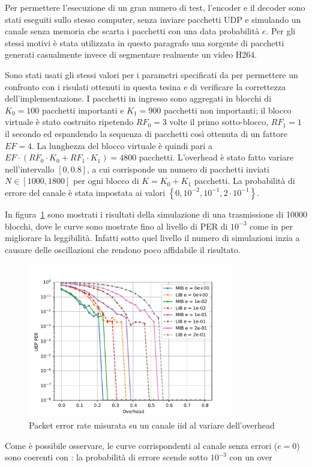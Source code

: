 \documentclass[italian, a4paper, 12pt]{article}
\begin{document}
Per permettere l'esecuzione di un gran numero di test, l'encoder e il
decoder sono stati eseguiti sullo stesso computer, senza inviare
pacchetti UDP e simulando un canale senza memoria che scarta i
pacchetti con una data probabilità $e$.
%
Per gli stessi motivi è stata utilizzata in questo paragrafo una
sorgente di pacchetti generati casualmente invece di segmentare
realmente un video H264.

Sono stati usati gli stessi valori per i parametri specificati da
\cite{uep} per permettere un confronto con i risulati ottenuti in
questa tesina e di verificare la correttezza dell'implementazione.
%
I pacchetti in ingresso sono aggregati in blocchi di $K_0 = 100$
pacchetti importanti e $K_1 = 900$ pacchetti non importanti; il blocco
virtuale è stato costruito ripetendo $RF_0 = 3$ volte il primo
sotto-blocco, $RF_1 = 1$ il secondo ed espandendo la sequenza di
pacchetti così ottenuta di un fattore $EF = 4$. La lunghezza del
blocco virtuale è quindi pari a $EF \cdot \left( RF_0 \cdot K_0 + RF_1
\cdot K_1 \right) = 4800$ pacchetti.
%
L'overhead è stato fatto variare nell'intervallo $[0, 0.8]$, a cui
corrisponde un numero di pacchetti inviati $N \in [1000, 1800]$ per
ogni blocco di $K=K_0+K_1$ pacchetti.
%
La probabilità di errore del canale è stata impostata ai valori
$\left\{ 0, 10^{-2}, 10^{-1}, 2 \cdot 10^{-1} \right\}$.

In figura~\ref{fig:iid} sono mostrati i risultati della simulazione di
una trasmissione di 10000 blocchi, dove le curve sono mostrate fino al
livello di PER di $10^{-3}$ come in \cite{uep} per migliorare la
leggibilità. Infatti sotto quel livello il numero di simulazioni inzia
a causare delle oscillazioni che rendono poco affidabile il risultato.
%
\begin{figure}[H]
    \centering
        \includegraphics[clip, trim=0cm 0cm 0cm 0cm, width=0.80\textwidth]{plot_ber_iid.pdf}
    \caption{Packet error rate misurata su un canale iid al variare
    dell'overhead}
    \label{fig:iid}
\end{figure}
%
Come è possibile osservare, le curve corrispondenti al canale senza
errori ($e=0$) sono coerenti con \cite{uep}: la probabilità di errore
scende sotto $10^{-3}$ con un over
\end{document}
